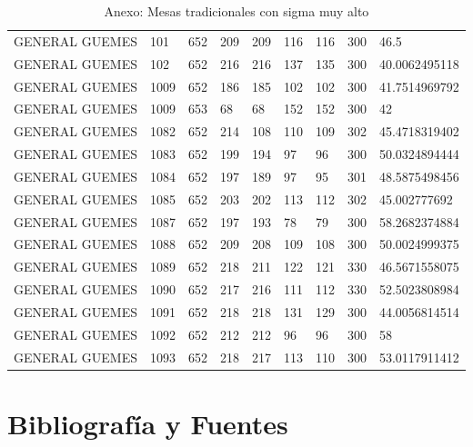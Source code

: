 \documentclass[12pt,a4paper]{article}
\begin{document}
\begin{table}[h!]
\begin{tabular}{lllllllll}
GENERAL GUEMES & 101       & 652          & 209 & 209 & 116 & 116 & 300       & 46.5          \\
GENERAL GUEMES & 102       & 652          & 216 & 216 & 137 & 135 & 300       & 40.0062495118 \\
GENERAL GUEMES & 1009      & 652          & 186 & 185 & 102 & 102 & 300       & 41.7514969792 \\
GENERAL GUEMES & 1009      & 653          & 68  & 68  & 152 & 152 & 300       & 42            \\
GENERAL GUEMES & 1082      & 652          & 214 & 108 & 110 & 109 & 302       & 45.4718319402 \\
GENERAL GUEMES & 1083      & 652          & 199 & 194 & 97  & 96  & 300       & 50.0324894444 \\
GENERAL GUEMES & 1084      & 652          & 197 & 189 & 97  & 95  & 301       & 48.5875498456 \\
GENERAL GUEMES & 1085      & 652          & 203 & 202 & 113 & 112 & 302       & 45.002777692  \\
GENERAL GUEMES & 1087      & 652          & 197 & 193 & 78  & 79  & 300       & 58.2682374884 \\
GENERAL GUEMES & 1088      & 652          & 209 & 208 & 109 & 108 & 300       & 50.0024999375 \\
GENERAL GUEMES & 1089      & 652          & 218 & 211 & 122 & 121 & 330       & 46.5671558075 \\
GENERAL GUEMES & 1090      & 652          & 217 & 216 & 111 & 112 & 330       & 52.5023808984 \\
GENERAL GUEMES & 1091      & 652          & 218 & 218 & 131 & 129 & 300       & 44.0056814514 \\
GENERAL GUEMES & 1092      & 652          & 212 & 212 & 96  & 96  & 300       & 58            \\
GENERAL GUEMES & 1093      & 652          & 218 & 217 & 113 & 110 & 300       & 53.0117911412\\
\hline
\end{tabular}
\caption{Anexo: Mesas tradicionales con sigma muy alto}
\label{table:1}
\end{table}

\pagebreak
\section{Bibliografía y Fuentes}
\end{document}
